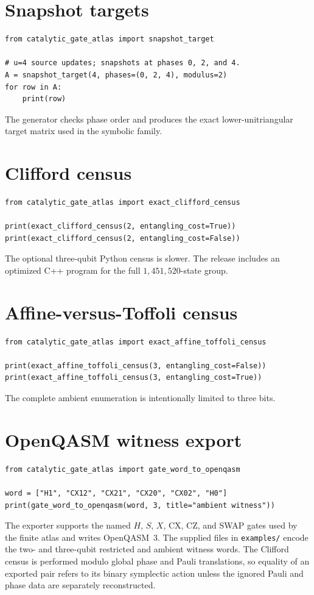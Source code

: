 \section{Snapshot targets}
\begin{lstlisting}[style=pythonstyle]
from catalytic_gate_atlas import snapshot_target

# u=4 source updates; snapshots at phases 0, 2, and 4.
A = snapshot_target(4, phases=(0, 2, 4), modulus=2)
for row in A:
    print(row)
\end{lstlisting}
The generator checks phase order and produces the exact lower-unitriangular target matrix used in the symbolic family.

\section{Clifford census}
\begin{lstlisting}[style=pythonstyle]
from catalytic_gate_atlas import exact_clifford_census

print(exact_clifford_census(2, entangling_cost=True))
print(exact_clifford_census(2, entangling_cost=False))
\end{lstlisting}
The optional three-qubit Python census is slower.  The release includes an optimized C++ program for the full $1{,}451{,}520$-state group.

\section{Affine-versus-Toffoli census}
\begin{lstlisting}[style=pythonstyle]
from catalytic_gate_atlas import exact_affine_toffoli_census

print(exact_affine_toffoli_census(3, entangling_cost=False))
print(exact_affine_toffoli_census(3, entangling_cost=True))
\end{lstlisting}
The complete ambient enumeration is intentionally limited to three bits.

\section{OpenQASM witness export}
\begin{lstlisting}[style=pythonstyle]
from catalytic_gate_atlas import gate_word_to_openqasm

word = ["H1", "CX12", "CX21", "CX20", "CX02", "H0"]
print(gate_word_to_openqasm(word, 3, title="ambient witness"))
\end{lstlisting}
The exporter supports the named $H$, $S$, $X$, CX, CZ, and SWAP gates used by the finite atlas and writes OpenQASM~3.  The supplied files in \texttt{examples/} encode the two- and three-qubit restricted and ambient witness words.  The Clifford census is performed modulo global phase and Pauli translations, so equality of an exported pair refers to its binary symplectic action unless the ignored Pauli and phase data are separately reconstructed.

